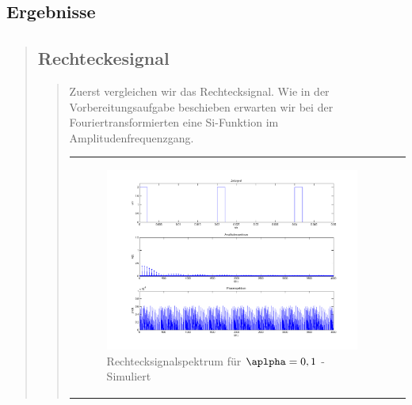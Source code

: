         
        
	
\subsection{Ergebnisse}
\begin{quote}
    \subsection{Rechteckesignal}
    \begin{quote}
        Zuerst vergleichen wir das Rechtecksignal. Wie in der Vorbereitungsaufgabe beschieben erwarten wir bei der
        Fouriertransformierten eine Si-Funktion im Amplitudenfrequenzgang.


            \begin{center}
            \begin{tabular}{ll}

            \hspace{-12em}
                \begin{minipage}{0.6\textwidth}

                    \begin{figure}[H]
                        \label{fig:}
                        \includegraphics[scale=0.25]{./Bilder/recht_alpha1.png} %
                        \caption{Rechtecksignalspektrum für $\aplpha = 0,1$ - Simuliert}
                    \end{figure}

                \end{minipage}
                \begin{minipage}{0.6\textwidth}


\end{minipage}
\end{tabular}
\end{center}
\end{quote}
\end{quote}
